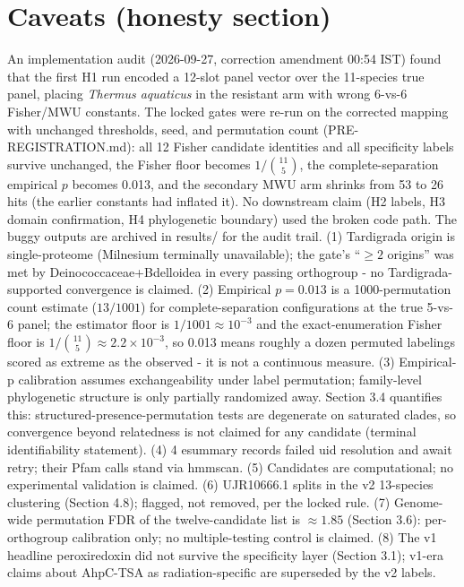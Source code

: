 \documentclass[12pt,a4paper]{article}
\begin{document}
\section{Caveats (honesty section)}
An implementation audit (2026-09-27, correction amendment 00:54 IST) found that the first H1 run encoded a 12-slot panel vector over the 11-species true panel, placing \emph{Thermus aquaticus} in the resistant arm with wrong 6-vs-6 Fisher/MWU constants. The locked gates were re-run on the corrected mapping with unchanged thresholds, seed, and permutation count (PRE-REGISTRATION.md): all 12 Fisher candidate identities and all specificity labels survive unchanged, the Fisher floor becomes $1/\binom{11}{5}$, the complete-separation empirical $p$ becomes 0.013, and the secondary MWU arm shrinks from 53 to 26 hits (the earlier constants had inflated it). No downstream claim (H2 labels, H3 domain confirmation, H4 phylogenetic boundary) used the broken code path. The buggy outputs are archived in results/ for the audit trail.
(1) Tardigrada origin is single-proteome (Milnesium terminally unavailable); the gate's ``$\geq 2$ origins'' was met by Deinococcaceae+Bdelloidea in every passing orthogroup - no Tardigrada-supported convergence is claimed. (2) Empirical $p=0.013$ is a 1000-permutation count estimate ($13/1001$) for complete-separation configurations at the true 5-vs-6 panel; the estimator floor is $1/1001 \approx 10^{-3}$ and the exact-enumeration Fisher floor is $1/\binom{11}{5} \approx 2.2\times10^{-3}$, so 0.013 means roughly a dozen permuted labelings scored as extreme as the observed - it is not a continuous measure. (3) Empirical-p calibration assumes exchangeability under label permutation; family-level phylogenetic structure is only partially randomized away. Section 3.4 quantifies this: structured-presence-permutation tests are degenerate on saturated clades, so convergence beyond relatedness is not claimed for any candidate (terminal identifiability statement). (4) 4 esummary records failed uid resolution and await retry; their Pfam calls stand via hmmscan. (5) Candidates are computational; no experimental validation is claimed. (6) UJR10666.1 splits in the v2 13-species clustering (Section 4.8); flagged, not removed, per the locked rule. (7) Genome-wide permutation FDR of the twelve-candidate list is $\approx 1.85$ (Section 3.6): per-orthogroup calibration only; no multiple-testing control is claimed. (8) The v1 headline peroxiredoxin did not survive the specificity layer (Section 3.1); v1-era claims about AhpC-TSA as radiation-specific are superseded by the v2 labels.
\end{document}
